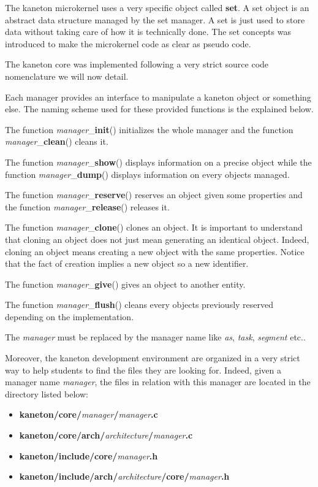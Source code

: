 The kaneton microkernel uses a very specific object called \textbf{set}.
A set object is an abstract data structure managed by the set manager.
A set is just used to store data without taking care of how it is technically
done. The set concepts was introduced to make the microkernel code as
clear as pseudo code.

The kaneton core was implemented following a very strict source code
nomenclature we will now detail.

Each manager provides an interface to manipulate a kaneton object or
something else. The naming scheme used for these provided functions
is the explained below.

The function \textit{manager}\_\textbf{init}() initializes the whole
manager and the function \textit{manager}\_\textbf{clean}() cleans it.

The function \textit{manager}\_\textbf{show}() displays information
on a precise object while the function \textit{manager}\_\textbf{dump}()
displays information on every objects managed.

The function \textit{manager}\_\textbf{reserve}() reserves an object
given some properties and the function \textit{manager}\_\textbf{release}()
releases it.

The function \textit{manager}\_\textbf{clone}() clones an object. It is
important to understand that cloning an object does not just mean
generating an identical object. Indeed, cloning an object means creating
a new object with the same properties. Notice that the fact of creation
implies a new object so a new identifier.

The function \textit{manager}\_\textbf{give}() gives an object to another
entity.

The function \textit{manager}\_\textbf{flush}() cleans every objects
previously reserved depending on the implementation.

The \textit{manager} must be replaced by the manager name like \textit{as},
\textit{task}, \textit{segment} etc..

Moreover, the kaneton development environment are organized in a very
strict way to help students to find the files they are looking for. Indeed,
given a manager name \textit{manager}, the files in relation with this
manager are located in the directory listed below:

\begin{itemize}
  \item
    \textbf{kaneton/core/}\textit{manager}\textbf{/}\textit{manager}\textbf{.c}
  \item
    \textbf{kaneton/core/arch/}\textit{architecture}\textbf{/}\textit{manager}\textbf{.c}
  \item
    \textbf{kaneton/include/core/}\textit{manager}\textbf{.h}
  \item
    \textbf{kaneton/include/arch/}\textit{architecture}\textbf{/core/}\textit{manager}\textbf{.h}
\end{itemize}

